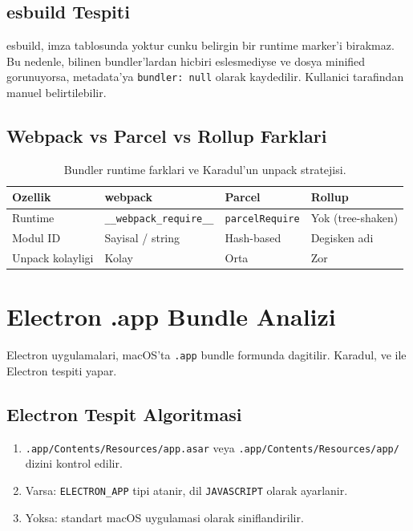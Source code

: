 \subsection{esbuild Tespiti}

esbuild, imza tablosunda yoktur cunku belirgin bir runtime marker'i birakmaz. Bu nedenle, bilinen bundler'lardan hicbiri eslesmediyse ve dosya minified gorunuyorsa, metadata'ya \texttt{bundler: null} olarak kaydedilir. Kullanici tarafindan manuel belirtilebilir.

\subsection{Webpack vs Parcel vs Rollup Farklari}

\begin{table}[htbp]
\centering
\begin{tabular}{lp{3.5cm}p{3.5cm}p{3.5cm}}
\toprule
\textbf{\color{sectioncyan}Ozellik} & \textbf{\color{sectioncyan}webpack} & \textbf{\color{sectioncyan}Parcel} & \textbf{\color{sectioncyan}Rollup} \\
\midrule
Runtime          & \texttt{\_\_webpack\_require\_\_} & \texttt{parcelRequire} & Yok (tree-shaken) \\
Modul ID         & Sayisal / string & Hash-based & Degisken adi \\
Unpack kolayligi & Kolay & Orta & Zor \\
\bottomrule
\end{tabular}
\caption{Bundler runtime farklari ve Karadul'un unpack stratejisi.}
\label{tab:bundler-compare}
\end{table}


\section{Electron .app Bundle Analizi}
\label{sec:electron-detection}

Electron uygulamalari, macOS'ta \texttt{.app} bundle formunda dagitilir. Karadul,  ve  ile Electron tespiti yapar.

\subsection{Electron Tespit Algoritmasi}

\begin{enumerate}
\item \texttt{.app/Contents/Resources/app.asar} veya \texttt{.app/Contents/Resources/app/} dizini kontrol edilir.
\item Varsa: \texttt{ELECTRON\_APP} tipi atanir, dil \texttt{JAVASCRIPT} olarak ayarlanir.
\item Yoksa: standart macOS uygulamasi olarak siniflandirilir.
\end{enumerate}

